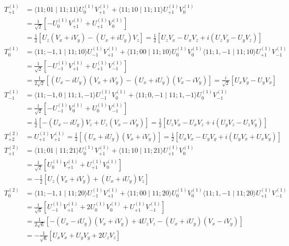 \documentclass[12pt]{article}
\begin{document}
\[
\begin{aligned} 
T_{+1}^{(1)} &=\langle 11 ; 01 \mid 11 ; 11\rangle U_{0}^{(1)} V_{+1}^{(1)}+\langle 11 ; 10 \mid 11 ; 11\rangle U_{+1}^{(1)} V_{0}^{(1)} \\ &=\frac{1}{\sqrt{2}}\left[-U_{0}^{(1)} V_{+1}^{(1)}+U_{+1}^{(1)} V_{0}^{(1)}\right] \\ &=\frac{1}{2}\left[U_{z}\left(V_{x}+i V_{y}\right)-\left(U_{x}+i U_{y}\right) V_{z}\right]=\frac{1}{2}\left[U_{z} V_{x}-U_{x} V_{z}+i\left(U_{z} V_{y}-U_{y} V_{z}\right)\right] \\ 
%
T_{0}^{(1)} &=\langle 11 ;-1,1 \mid 11 ; 10\rangle U_{-1}^{(1)} V_{+1}^{(1)}+\langle 11 ; 00 \mid 11 ; 10\rangle U_{0}^{(1)} V_{0}^{(1)}\langle 11 ; 1,-1 \mid 11 ; 10\rangle U_{+1}^{(1)} V_{-1}^{(1)} \\ &=\frac{1}{\sqrt{2}}\left[-U_{-1}^{(1)} V_{+1}^{(1)}+U_{+1}^{(1)} V_{-1}^{(1)}\right] \\ &=\frac{1}{2 \sqrt{2}}\left[\left(U_{x}-i U_{y}\right)\left(V_{x}+i V_{y}\right)-\left(U_{x}+i U_{y}\right)\left(V_{x}-i V_{y}\right)\right]=\frac{i}{\sqrt{2}}\left[U_{x} V_{y}-U_{y} V_{x}\right] \\
%
T_{-1}^{(1)} &=\langle 11 ;-1,0 \mid 11 ; 1,-1\rangle U_{-1}^{(1)} V_{0}^{(1)}+\langle 11 ; 0,-1 \mid 11 ; 1,-1\rangle U_{0}^{(1)} V_{-1}^{(1)} \\ &=\frac{1}{\sqrt{2}}\left[-U_{-1}^{(1)} V_{0}^{(1)}+U_{0}^{(1)} V_{-1}^{(1)}\right] \\ &=\frac{1}{2}\left[-\left(U_{x}-i U_{y}\right) V_{z}+U_{z}\left(V_{x}-i V_{y}\right)\right]=\frac{1}{2}\left[U_{z} V_{x}-U_{x} V_{z}+i\left(U_{y} V_{z}-U_{z} V_{y}\right)\right] \\ 
%
T_{+2}^{(2)} &=U_{+1}^{(1)} V_{+1}^{(1)}=\frac{1}{2}\left[\left(U_{x}+i U_{y}\right)\left(V_{x}+i V_{y}\right)\right]=\frac{1}{2}\left[U_{x} V_{x}-U_{y} V_{y}+i\left(U_{y} V_{x}+U_{x} V_{y}\right)\right] \\ 
%
T_{+1}^{(2)} &=\langle 11 ; 01 \mid 11 ; 21\rangle U_{0}^{(1)} V_{+1}^{(1)}+\langle 11 ; 10 \mid 11 ; 21\rangle U_{+1}^{(1)} V_{0}^{(1)} \\ &=\frac{1}{\sqrt{2}}\left[U_{0}^{(1)} V_{+1}^{(1)}+U_{+1}^{(1)} V_{0}^{(1)}\right] \\ &=-\frac{1}{2}\left[U_{z}\left(V_{x}+i V_{y}\right)+\left(U_{x}+i U_{y}\right) V_{z}\right]\\
%
T_{0}^{(2)} &=\langle 11 ;-1,1 \mid 11 ; 20\rangle U_{-1}^{(1)} V_{+1}^{(1)}+\langle 11 ; 00 \mid 11 ; 20\rangle U_{0}^{(1)} V_{0}^{(1)}\langle 11 ; 1,-1 \mid 11 ; 20\rangle U_{+1}^{(1)} V_{-1}^{(1)} \\ &=\frac{1}{\sqrt{6}}\left[U_{-1}^{(1)} V_{+1}^{(1)}+2 U_{0}^{(1)} V_{0}^{(1)}+U_{+1}^{(1)} V_{-1}^{(1)}\right] \\ &=\frac{1}{2 \sqrt{6}}\left[-\left(U_{x}-i U_{y}\right)\left(V_{x}+i V_{y}\right)+4 U_{z} V_{z}-\left(U_{x}+i U_{y}\right)\left(V_{x}-i V_{y}\right)\right] \\ &=-\frac{1}{\sqrt{6}}\left[U_{x} V_{x}+U_{y} V_{y}+2 U_{z} V_{z}\right] \\ 

\end{aligned}\]
\end{document}
